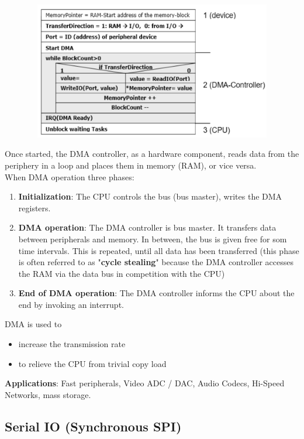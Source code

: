     \begin{figure}[h]
    \centering
    \includegraphics[width=12cm, height=6cm]{Images/image181.png}
    \label{fig:Fig }
    \end{figure}

Once started, the DMA controller, as a hardware component, reads data from the periphery in a loop and places them in memory (RAM), or vice versa.\\
\newpage
When DMA operation three phases:

\begin{enumerate}
\item  \textbf{Initialization}: The CPU controls the bus (bus master), writes the DMA registers.
\item  \textbf{DMA operation}: The DMA controller is bus master. It transfers data between peripherals and memory. In between, the bus is given free for som time intervals. This is repeated, until all data has been transferred (this phase is often referred to as "\textbf{cycle stealing}" because the DMA controller accesses the RAM via the data bus in competition with the CPU)
\item  \textbf{End of DMA operation}: The DMA controller informs the CPU about the end by invoking an interrupt.
\end{enumerate}

DMA is used to

\begin{itemize}
\item  increase the transmission rate
\item  to relieve the CPU from trivial copy load
\end{itemize}

\textbf{Applications}: Fast peripherals, Video ADC / DAC, Audio Codecs, Hi-Speed Networks,          mass storage.

\subsection{Serial IO (Synchronous SPI)}

